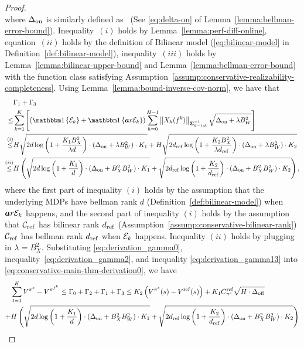 \begin{proof}
\begin{equation}
\end{equation}
where $\Delta_\mathrm{on}$ is similarly defined as~\citet{song2023hybrid} (See \eqref{eq:delta-on} of Lemma~\ref{lemma:bellman-error-bound}). Inequality~$(i)$ holds by Lemma~\ref{lemma:perf-diff-online}, equation~$(ii)$ holds by the definition of Bilinear model (\eqref{eq:bilinear-model} in Definition~\ref{def:bilinear-model}), inequality~$(iii)$ holds by Lemma~\ref{lemma:bilinear-upper-bound} and Lemma~\ref{lemma:bellman-error-bound} with the function class satisfying Assumption~\ref{assump:conservative-realizability-completeness}. Using Lemma~\ref{lemma:bound-inverse-cov-norm}, we have that 
{\small
\begin{equation}
    \label{eq:derivation_gamma13}
    \begin{split}
        &\Gamma_1+\Gamma_3\\
        \leq&\sum_{k=1}^K\brac{\paren{\indicator{\mc E_k}+\indicator{\mathbf{a}r{\mc E}_k}}\sum_{h=0}^{H-1}\norm{X_h(f^k)}{\mb \Sigma^{-1}_{k-1;h}}\sqrt{\Deltaon+\lambda B_W^2}}\\
        \overset{(i)}{\leq} &H\sqrt{2d\log\paren{1+\frac{K_1B_X^2}{\lambda d}}\cdot(\Deltaon+\lambda B_W^2)\cdot K_1}+H\sqrt{2d_\mr{ref}\log\paren{1+\frac{K_2B_X^2}{\lambda d_\mr{ref}}}\cdot(\Deltaon+\lambda B_W^2)\cdot K_2}\\
        \overset{(ii)}{\leq} &H\paren{\sqrt{2d\log\paren{1+\frac{K_1}{ d}}\cdot(\Deltaon+B_X^2 B_W^2)\cdot K_1}+\sqrt{2d_\mr{ref}\log\paren{1+\frac{K_2}{d_\mr{ref}}}\cdot(\Deltaon+B_X^2 B_W^2)\cdot K_2}},
    \end{split}
\end{equation}
}
where the first part of inequality $(i)$ holds by the assumption that the underlying MDPs have bellman rank $d$ (Definition~\ref{def:bilinear-model}) when $\boldsymbol{a}r{\mathcal E}_k$ happens, and the second part of inequality $(i)$ holds by the assumption 
that $\mathcal C_\mathrm{ref}$ has bilinear rank $d_\mathrm{ref}$ (Assumption~\ref{assump:conservative-bilinear-rank}) $\mathcal C_\mathrm{ref}$ has bellman rank $d_\mathrm{ref}$ when $\mathcal E_k$ happens. Inequality $(ii)$ holds by plugging in $\lambda = B_X^2$. Substituting \eqref{eq:derivation_gamma0}, inequality~\ref{eq:derivation_gamma2}, and inequality \eqref{eq:derivation_gamma13} into \eqref{eq:conservative-main-thm-derivation0}, we have 
{\small
\begin{equation}
    \begin{split}
        &\sum_{t=1}^K V^{\pi^e}-V^{\pi^{f^k}}\leq \Gamma_0 + \Gamma_2 + \Gamma_1 + \Gamma_3 \leq K_2\left( V^{\pi^e}(s)-V^{\mathrm{ref}}(s) \right) + K_1C_{\pi^e}^\mathrm{ref}\sqrt{H\cdot \Delta_\mathrm{off}}\\
        +& H\left( \sqrt{2d\log\left( 1+\frac{K_1}{ d} \right)\cdot(\Delta_\mathrm{on}+B_X^2 B_W^2)\cdot K_1}+\sqrt{2d_\mathrm{ref}\log\left( 1+\frac{K_2}{d_\mathrm{ref}} \right)\cdot(\Delta_\mathrm{on}+B_X^2 B_W^2)\cdot K_2} \right)
    \end{split}
\end{equation}
}


\end{proof}
